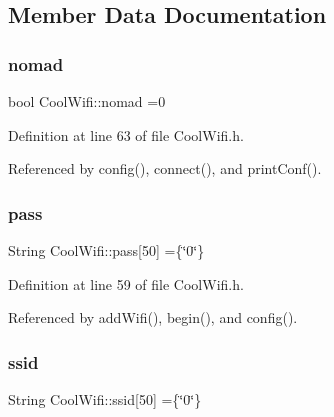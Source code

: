 \subsection{Member Data Documentation}
\mbox{\label{classCoolWifi_ab7d9643c4af7bac3be331ef008b2ea27}} 
\subsubsection{\texorpdfstring{nomad}{nomad}}
{\footnotesize\ttfamily bool Cool\+Wifi\+::nomad =0\hspace{0.3cm}{\ttfamily [private]}}



Definition at line 63 of file Cool\+Wifi.\+h.



Referenced by config(), connect(), and print\+Conf().

\mbox{\label{classCoolWifi_a0c3332a149245aaad060b32593a54c9b}} 
\subsubsection{\texorpdfstring{pass}{pass}}
{\footnotesize\ttfamily String Cool\+Wifi\+::pass\mbox{[}50\mbox{]} =\{\char`\"{}0\char`\"{}\}\hspace{0.3cm}{\ttfamily [private]}}



Definition at line 59 of file Cool\+Wifi.\+h.



Referenced by add\+Wifi(), begin(), and config().

\mbox{\label{classCoolWifi_a893b21d0fed821438733bba2e73fb4c2}} 
\subsubsection{\texorpdfstring{ssid}{ssid}}
{\footnotesize\ttfamily String Cool\+Wifi\+::ssid\mbox{[}50\mbox{]} =\{\char`\"{}0\char`\"{}\}\hspace{0.3cm}{\ttfamily [private]}}



